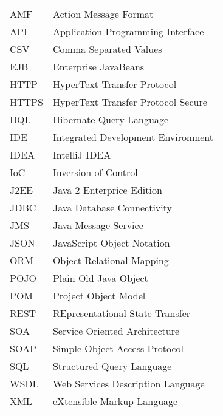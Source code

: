 
\seznamzkr

\begin{tabular}{ll}
  AMF	& Action Message Format					\\
  API	& Application Programming Interface		\\
  CSV	& Comma Separated Values				\\
  EJB	& Enterprise JavaBeans					\\
  HTTP	& HyperText Transfer Protocol			\\
  HTTPS	& HyperText Transfer Protocol Secure	\\
  HQL	& Hibernate Query Language				\\
  IDE	& Integrated Development Environment	\\
  IDEA	& IntelliJ IDEA							\\
  IoC	& Inversion of Control					\\
  J2EE	& Java 2 Enterprice Edition				\\
  JDBC	& Java Database Connectivity			\\
  JMS	& Java Message Service					\\
  JSON	& JavaScript Object Notation			\\
  ORM	& Object-Relational Mapping				\\
  POJO	& Plain Old Java Object					\\
  POM	& Project Object Model					\\
  REST	& REpresentational State Transfer		\\
  SOA	& Service Oriented Architecture			\\
  SOAP	& Simple Object Access Protocol 		\\
  SQL	& Structured Query Language		 		\\
  WSDL	& Web Services Description Language		\\
  XML	& eXtensible Markup Language			\\
\end{tabular}

